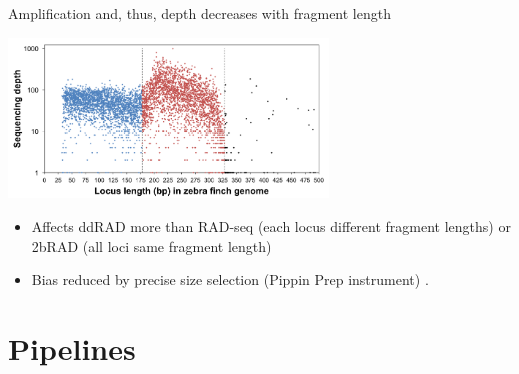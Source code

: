 \documentclass[presentation]{beamer}
\begin{document}
\begin{frame}[label=sec-3-2-4]{Amplification and, thus, depth decreases with fragment length}
\begin{center}
\includegraphics[width=8.5cm]{DaCosta2014Fig1b.png}

\tiny{\citep{Dacosta2014}}
\end{center}
\begin{itemize}
\item Affects ddRAD more than RAD-seq (each locus different fragment lengths) or 2bRAD (all loci same fragment length)
\end{itemize}
\begin{itemize}
\item Bias reduced by precise size selection (Pippin Prep instrument)
\citep{Dacosta2014}.
\end{itemize}
\end{frame}




\section{Pipelines}
\label{sec-4}
\end{document}
